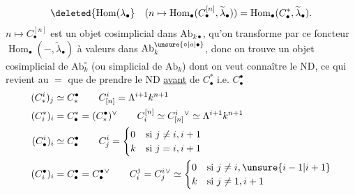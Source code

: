 \[
\deleted{\operatorname{Hom}(\lambda_\bullet}\quad
(n\mapsto\operatorname{Hom}_\bullet(C_\bullet^{[n]},\widetilde\lambda_\bullet))=\operatorname{Hom}_\bullet(C_\bullet^*,\widetilde\lambda_\bullet).
\]
$n\longmapsto C_\bullet^{[n]}$ est un objet cosimplicial dans $\mathrm{Ab}_{k\bullet}$, qu'on transforme par ce foncteur  $\operatorname{Hom}_\bullet(-,\widetilde\lambda_\bullet)$ à valeurs dans $\mathrm{Ab}_k^{\unsure{\circ|o|\bullet}}$, donc on trouve un objet cosimplicial de $\mathrm{Ab}_k^\circ$ (ou simplicial de $\mathrm{Ab}_k$) dont on veut connaître le ND, ce qui revient au $={}$ que de prendre le ND \uline{avant} de $C_\bullet^*$ i.e. $C_\bullet^\bullet$
\[
\begin{aligned}
(C^i_*)_j&\simeq C^\bullet_*\qquad C^i_{[n]}=\Lambda^{i+1}k^{n+1}\\
(C_i^*)_i&=C_\bullet^*=(C^\bullet_*)^\vee
\qquad C_i^{[n]}\simeq C^i_{[n]}{}^\vee\simeq\Lambda^{i+1}k^{n+1}\\
(C^i_\bullet)_i&\simeq C^\bullet_\bullet\qquad
 C^i_j=\begin{cases}0&\text{si }j\neq i,i+1\\k&\text{si }j=i,i+1\end{cases}\\
(C_i^\bullet)_i&=C_\bullet^\bullet=C^\bullet_\bullet{}^\vee\qquad
 C_i^j=C^i_j{}^\vee\simeq\begin{cases}0&\text{si }j\neq i,\unsure{i-1|i+1}\\k&\text{si }j\neq1,i+1\end{cases}
\end{aligned}
\]
